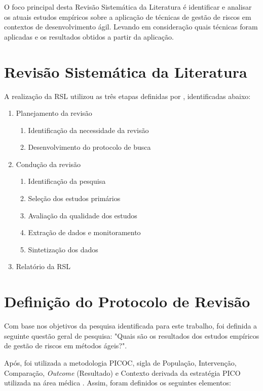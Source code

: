 \documentclass[
    12pt,       %
    openright,      %
    twoside,      %
    a4paper,      %
    english,      %
    french,       %
    spanish,      %
    brazil,       %
    ]{abntex2}
\begin{document}
O foco principal desta Revisão Sistemática da Literatura é identificar e analisar os atuais estudos empíricos sobre a aplicação de técnicas de gestão de riscos em contextos de desenvolvimento ágil. Levando em consideração quais técnicas foram aplicadas e os resultados obtidos a partir da aplicação.

\section{Revisão Sistemática da Literatura}

A realização da RSL utilizou as três etapas definidas por , identificadas abaixo: 

\begin{enumerate}
    \item Planejamento da revisão
        \begin{enumerate}
            \item Identificação da necessidade da revisão
            \item Desenvolvimento do protocolo de busca
        \end{enumerate}
    \item Condução da revisão
        \begin{enumerate}
            \item Identificação da pesquisa
            \item Seleção dos estudos primários
            \item Avaliação da qualidade dos estudos
            \item Extração de dados e monitoramento
            \item Sintetização dos dados
        \end{enumerate}
    \item Relatório da RSL
\end{enumerate}

\section{Definição do Protocolo de Revisão}

Com base nos objetivos da pesquisa identificada para este trabalho, foi definida a seguinte questão geral de pesquisa: "Quais são os resultados dos estudos empíricos de gestão de riscos em métodos ágeis?".

Após, foi utilizada a metodologia PICOC, sigla de População, Intervenção, Comparação, \textit{Outcome} (Resultado) e Contexto derivada da estratégia PICO utilizada na área médica \cite{SANTOS:2007}. Assim, foram definidos os seguintes elementos:
\end{document}
